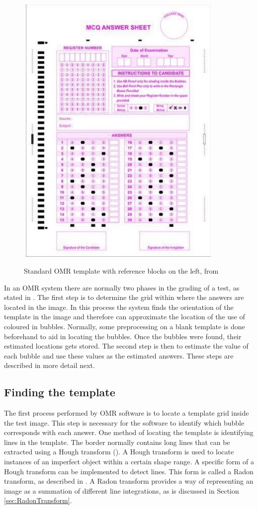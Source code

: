 \begin{figure}
  \centering
  \includegraphics[width=10cm]{omrTemplate}\\
  \caption{Standard OMR template with reference blocks on the left, from \citet{stdTemplate}}
  \label{fig:omrTemplate}
\end{figure}

In an OMR system there are normally two phases in the grading of a test, as stated in \citet{DraganI2003}. The first step is to determine the grid within where the answers are located in the image. In this process the system finds the orientation of the template in the image and therefore can approximate the location of the use of coloured in bubbles. Normally, some preprocessing on a blank template is done beforehand to aid in locating the bubbles. Once the bubbles were found, their estimated locations gets stored. The second step is then to estimate the value of each bubble and use these values as the estimated answers. These steps are described in more detail next.

\subsection{Finding the template}

The first process performed by OMR software is to locate a template grid inside the test image. This step is necessary for the software to identify which bubble corresponds with each answer. One method of locating the template is identifying lines in the template. The border normally contains long lines that can be extracted using a Hough transform (\citet{MVGI2015}). A Hough transform is used to locate instances of an imperfect object within a certain shape range. A specific form of a Hough transform can be implemented to detect lines. This form is called a Radon transform, as described in \citet{MathWorks}. A Radon transform provides a way of representing an image as a summation of different line integrations, as is discussed in Section \ref{sec:RadonTransform}. 

